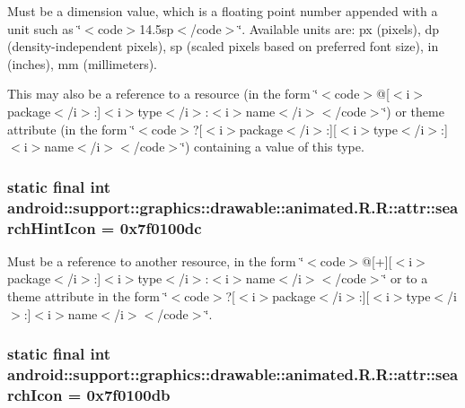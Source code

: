 Must be a dimension value, which is a floating point number appended with a unit such as \char`\"{}$<$code$>$14.5sp$<$/code$>$\char`\"{}. Available units are: px (pixels), dp (density-independent pixels), sp (scaled pixels based on preferred font size), in (inches), mm (millimeters). 

This may also be a reference to a resource (in the form \char`\"{}$<$code$>$@\mbox{[}$<$i$>$package$<$/i$>$:\mbox{]}$<$i$>$type$<$/i$>$:$<$i$>$name$<$/i$>$$<$/code$>$\char`\"{}) or theme attribute (in the form \char`\"{}$<$code$>$?\mbox{[}$<$i$>$package$<$/i$>$:\mbox{]}\mbox{[}$<$i$>$type$<$/i$>$:\mbox{]}$<$i$>$name$<$/i$>$$<$/code$>$\char`\"{}) containing a value of this type. \hypertarget{classandroid_1_1support_1_1graphics_1_1drawable_1_1animated_1_1_r_1_1attr_852ff33255c7aeb11e9506fcde417807}{
\subsubsection[{searchHintIcon}]{\setlength{\rightskip}{0pt plus 5cm}static final int android::support::graphics::drawable::animated.R.R::attr::searchHintIcon = 0x7f0100dc}}
\label{classandroid_1_1support_1_1graphics_1_1drawable_1_1animated_1_1_r_1_1attr_852ff33255c7aeb11e9506fcde417807}


Must be a reference to another resource, in the form \char`\"{}$<$code$>$@\mbox{[}+\mbox{]}\mbox{[}$<$i$>$package$<$/i$>$:\mbox{]}$<$i$>$type$<$/i$>$:$<$i$>$name$<$/i$>$$<$/code$>$\char`\"{} or to a theme attribute in the form \char`\"{}$<$code$>$?\mbox{[}$<$i$>$package$<$/i$>$:\mbox{]}\mbox{[}$<$i$>$type$<$/i$>$:\mbox{]}$<$i$>$name$<$/i$>$$<$/code$>$\char`\"{}. \hypertarget{classandroid_1_1support_1_1graphics_1_1drawable_1_1animated_1_1_r_1_1attr_413d0265e27e07306b050b685ca885bf}{
\subsubsection[{searchIcon}]{\setlength{\rightskip}{0pt plus 5cm}static final int android::support::graphics::drawable::animated.R.R::attr::searchIcon = 0x7f0100db}}
\label{classandroid_1_1support_1_1graphics_1_1drawable_1_1animated_1_1_r_1_1attr_413d0265e27e07306b050b685ca885bf}


